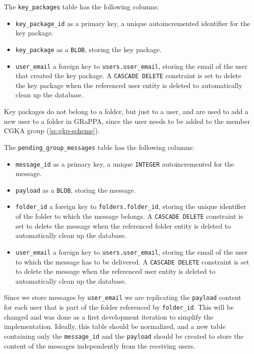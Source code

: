The \texttt{key\_packages} table has the following columns:
\begin{itemize}
    \item \texttt{key\_package\_id} as a primary key, a unique autoincremented identifier for the key package.
    \item \texttt{key\_package} as a \texttt{BLOB}, storing the key package.
    \item \texttt{user\_email} a foreign key to \texttt{users.user\_email}, storing the email of the user that created the key package. A \texttt{CASCADE DELETE} constraint is set to delete the key package when the referenced user entity is deleted to automatically clean up the database.
\end{itemize}
Key packages do not belong to a folder, but just to a user, and are used to
add a new user to a folder in GRaPPA, since the user needs to be added to the
member CGKA group (\cref{sc:gkp-scheme}).

The \texttt{pending\_group\_messages} table has the following columns:
\begin{itemize}
    \item \texttt{message\_id} as a primary key, a unique \texttt{INTEGER} autoincremented for the message.
    \item \texttt{payload} as a \texttt{BLOB}, storing the message.
    \item \texttt{folder\_id} a foreign key to \texttt{folders.folder\_id}, storing the unique identifier of the folder to which the message belongs. A \texttt{CASCADE DELETE} constraint is set to delete the message when the referenced folder entity is deleted to automatically clean up the database.
    \item \texttt{user\_email} a foreign key to \texttt{users.user\_email}, storing the email of the user to which the message has to be delivered. A \texttt{CASCADE DELETE} constraint is set to delete the message when the referenced user entity is deleted to automatically clean up the database.
\end{itemize}
Since we store messages by \texttt{user\_email} we are replicating
the \texttt{payload} content for each user that is part of the folder 
referenced by \texttt{folder\_id}. This will be changed and was done as a first
development iteration to simplify the implementation. Ideally, this table should be
normalized, and a new table containing only the \texttt{message\_id}
and the \texttt{payload} should be created to store the content of the messages
independently from the receiving users.

